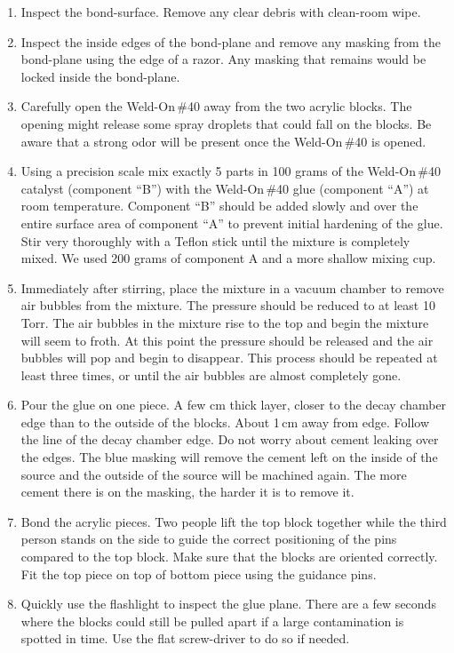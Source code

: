 \begin{enumerate}
\item Inspect the bond-surface. Remove any clear debris with clean-room wipe. 
\item Inspect the inside edges of the bond-plane and remove any masking from the bond-plane using the edge of a razor. Any masking that remains would be locked inside the bond-plane. 
\item Carefully open the Weld-On\,\#40 away from the two acrylic blocks. The opening  might release some spray droplets that could fall on the blocks. Be aware that a strong odor will be present once the Weld-On\,\#40 is opened. 
\item Using a precision scale mix exactly 5 parts in 100 grams of the Weld-On\,\#40 catalyst (component ``B'') with the Weld-On\,\#40 glue (component ``A'') at room temperature. Component ``B'' should be added slowly and over the entire surface area of component ``A'' to prevent initial hardening of the glue. Stir very thoroughly with a Teflon stick until the mixture is completely mixed. We used 200 grams of component A and a more shallow mixing cup.
\item Immediately after stirring, place the mixture in a vacuum chamber to remove air bubbles from the mixture. The pressure should be reduced to at least 10 Torr. The air bubbles in the mixture rise to the top and begin the mixture will seem to froth. At this point the pressure should be released and the air bubbles will pop and begin to disappear. This process should be repeated at least three times, or until the air bubbles are almost completely gone.
\item Pour the glue on one piece.  A few cm thick layer, closer to the decay chamber edge than to the outside of the blocks. About 1\,cm away from edge. Follow the line of the decay chamber edge. Do not worry about cement leaking over the edges. The blue masking will remove the cement left on the inside of the source and the outside of the source will be machined again. The more cement there is on the masking, the harder it is to remove it.
\item Bond the acrylic pieces. Two people lift the  top block together while the third person stands on the side to guide the correct positioning of the pins compared to the top block. Make sure that the blocks are oriented correctly. Fit the top piece on top of bottom piece using the guidance pins.
\item Quickly use the flashlight to inspect the glue plane. There are a few seconds where the blocks could still be pulled apart if a large contamination is spotted in time. Use the flat screw-driver to do so if needed.

\end{enumerate}
